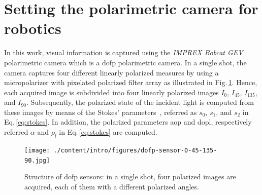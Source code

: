 \graphicspath{{./content/intro/figures/}}
\section{Setting the polarimetric camera for robotics}
\label{sec:rosify}

In this work, visual information is captured using the \emph{IMPREX Bobcat GEV}
polarimetric camera which is a \gls{dofp} polarimetric camera. In a single shot,
the camera captures four different linearly polarized measures by using
a micropolarizer with pixelated polarized filter array as illustrated in
Fig.\,\ref{fig:dofp-sensor}. Hence, each acquired image is subdivided into four
linearly polarized images $I_0$, $I_{45}$, $I_{135}$, and
$I_{90}$. Subsequently, the polarized state of the incident light is computed
from these images by means of the Stokes'
parameters~\cite{goldstein2017polarized}, referred as $s_0$, $s_1$, and $s_2$
in Eq.\,\eqref{eq:stokes}. In addition, the polarized parameters \gls{aop} and
\gls{dopl}, respectively referred $\alpha$ and $\rho_l$ in
Eq.\,\eqref{eq:stokes} are computed.


\begin{figure}
  \centering
  \texttt{[image: ./content/intro/figures/dofp-sensor-0-45-135-90.jpg]}
  \caption{Structure of \gls{dofp} sensors: in a single shot, four polarized
    images are acquired, each of them with a different polarized angles.}
    \label{fig:dofp-sensor}
\end{figure}


